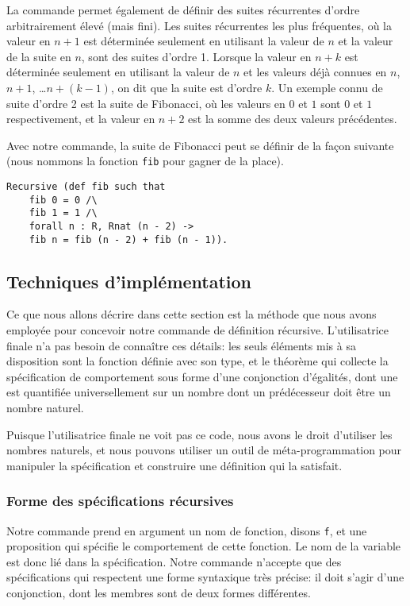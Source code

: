 \documentclass{jflart}
\begin{document}
La commande permet également de définir des suites récurrentes d'ordre
arbitrairement élevé (mais fini).  Les suites récurrentes les plus fréquentes,
où la valeur en \(n + 1\) est déterminée seulement en utilisant la valeur de
\(n\) et la valeur de la suite en \(n\), sont des suites d'ordre 1.  Lorsque
la valeur en \(n + k\) est déterminée seulement en utilisant la valeur de 
\(n\) et les valeurs déjà connues en \(n\), \(n + 1\), \dots \(n + (k - 1)\),
on dit que la suite est d'ordre \(k\).  Un exemple connu de suite d'ordre 2
est la suite de Fibonacci, où les valeurs en \(0\) et \(1\) sont \(0\) et \(1\)
respectivement, et la valeur en \(n + 2\) est la somme des deux
valeurs précédentes.

Avec notre commande, la suite de Fibonacci peut se définir de la façon
suivante (nous nommons la fonction \texttt{fib} pour gagner de la place).
\begin{verbatim}
Recursive (def fib such that
    fib 0 = 0 /\
    fib 1 = 1 /\
    forall n : R, Rnat (n - 2) ->
    fib n = fib (n - 2) + fib (n - 1)).
\end{verbatim}

\subsection{Techniques d'implémentation}
Ce que nous allons décrire dans cette section est la méthode que nous avons
employée pour concevoir notre commande de définition récursive.
L'utilisatrice finale n'a pas besoin de connaître ces détails: les
seuls éléments mis à sa disposition sont la fonction définie avec son
type, et le théorème qui collecte la spécification de comportement
sous forme d'une conjonction d'égalités, dont une est quantifiée
universellement sur un nombre dont un prédécesseur doit être un nombre
naturel.

Puisque l'utilisatrice finale ne voit pas ce code, nous avons le droit
d'utiliser les nombres naturels, et nous pouvons utiliser un outil de
méta-programmation pour manipuler la spécification
et construire une définition qui la satisfait.

\subsubsection{Forme des spécifications récursives}
Notre commande prend en argument un nom de fonction, disons \texttt{f},
et une
proposition qui spécifie le comportement de cette fonction.  Le nom de
la variable est donc lié dans la spécification.  Notre
commande n'accepte que des spécifications qui respectent une forme
syntaxique très précise: il doit s'agir d'une conjonction, dont les
membres sont de deux formes différentes.
\end{document}
